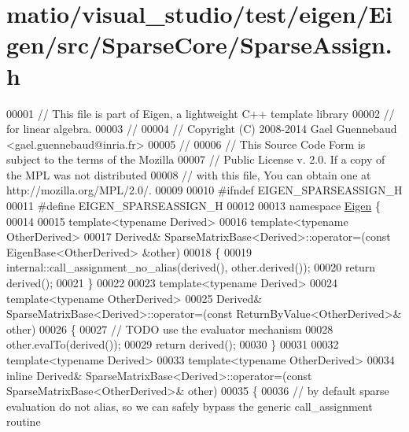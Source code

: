 \hypertarget{matio_2visual__studio_2test_2eigen_2_eigen_2src_2_sparse_core_2_sparse_assign_8h_source}{}\section{matio/visual\+\_\+studio/test/eigen/\+Eigen/src/\+Sparse\+Core/\+Sparse\+Assign.h}
\label{matio_2visual__studio_2test_2eigen_2_eigen_2src_2_sparse_core_2_sparse_assign_8h_source}

\begin{DoxyCode}
00001 \textcolor{comment}{// This file is part of Eigen, a lightweight C++ template library}
00002 \textcolor{comment}{// for linear algebra.}
00003 \textcolor{comment}{//}
00004 \textcolor{comment}{// Copyright (C) 2008-2014 Gael Guennebaud <gael.guennebaud@inria.fr>}
00005 \textcolor{comment}{//}
00006 \textcolor{comment}{// This Source Code Form is subject to the terms of the Mozilla}
00007 \textcolor{comment}{// Public License v. 2.0. If a copy of the MPL was not distributed}
00008 \textcolor{comment}{// with this file, You can obtain one at http://mozilla.org/MPL/2.0/.}
00009 
00010 \textcolor{preprocessor}{#ifndef EIGEN\_SPARSEASSIGN\_H}
00011 \textcolor{preprocessor}{#define EIGEN\_SPARSEASSIGN\_H}
00012 
00013 \textcolor{keyword}{namespace }\hyperlink{namespace_eigen}{Eigen} \{ 
00014 
00015 \textcolor{keyword}{template}<\textcolor{keyword}{typename} Derived>    
00016 \textcolor{keyword}{template}<\textcolor{keyword}{typename} OtherDerived>
00017 Derived& SparseMatrixBase<Derived>::operator=(\textcolor{keyword}{const} EigenBase<OtherDerived> &other)
00018 \{
00019   internal::call\_assignment\_no\_alias(derived(), other.derived());
00020   \textcolor{keywordflow}{return} derived();
00021 \}
00022 
00023 \textcolor{keyword}{template}<\textcolor{keyword}{typename} Derived>
00024 \textcolor{keyword}{template}<\textcolor{keyword}{typename} OtherDerived>
00025 Derived& SparseMatrixBase<Derived>::operator=(\textcolor{keyword}{const} ReturnByValue<OtherDerived>& other)
00026 \{
00027   \textcolor{comment}{// TODO use the evaluator mechanism}
00028   other.evalTo(derived());
00029   \textcolor{keywordflow}{return} derived();
00030 \}
00031 
00032 \textcolor{keyword}{template}<\textcolor{keyword}{typename} Derived>
00033 \textcolor{keyword}{template}<\textcolor{keyword}{typename} OtherDerived>
00034 \textcolor{keyword}{inline} Derived& SparseMatrixBase<Derived>::operator=(\textcolor{keyword}{const} SparseMatrixBase<OtherDerived>& other)
00035 \{
00036   \textcolor{comment}{// by default sparse evaluation do not alias, so we can safely bypass the generic call\_assignment routine}

\end{DoxyCode}
